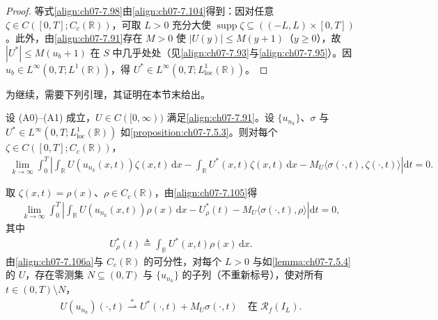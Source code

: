 \documentclass[../../main.tex]{subfiles}%
\begin{document}
\begin{proof}
等式\eqref{align:ch07-7.98}由\eqref{align:ch07-7.104}得到：因对任意 $\zeta\in C([0,T];C_c(\mathbb{R}))$，可取 $L>0$ 充分大使 $\operatorname{supp}\zeta\subseteq((-L,L)\times[0,T])$。此外，由\eqref{align:ch07-7.91}存在 $M>0$ 使 $|U(y)|\leqslant M(y+1)$（$y\geqslant0$），故 $|U^*|\leqslant M(u_b+1)$ 在 $S$ 中几乎处处（见\eqref{align:ch07-7.93}与\eqref{align:ch07-7.95}）。因 $u_b\in L^\infty(0,T;L^1(\mathbb{R}))$，得 $U^*\in L^\infty(0,T;L^1_{\mathrm{loc}}(\mathbb{R}))$。
\end{proof}

为继续，需要下列引理，其证明在本节末给出。

\begin{lemma}\label{lemma:ch07-7.5.4}
设 (A0)--(A1) 成立，$U\in C([0,\infty))$ 满足\eqref{align:ch07-7.91}。设 $\{u_{n_k}\}$、$\sigma$ 与 $U^*\in L^\infty(0,T;L^1_{\mathrm{loc}}(\mathbb{R}))$ 如\cref{proposition:ch07-7.5.3}。则对每个 $\zeta\in C([0,T];C_c(\mathbb{R}))$，
\begin{align}
\lim_{k\to\infty}\int_0^T\left|\int_{\mathbb{R}}U(u_{n_k}(x,t))\zeta(x,t)\,\mathrm{d}x
-\int_{\mathbb{R}}U^*(x,t)\zeta(x,t)\,\mathrm{d}x
-M_U\langle\sigma(\cdot,t),\zeta(\cdot,t)\rangle\right|\mathrm{d}t=0. \label{align:ch07-7.105}
\end{align}
\end{lemma}

\begin{remark}\label{remark:ch07-7.5.1}
取 $\zeta(x,t)=\rho(x)$、$\rho\in C_c(\mathbb{R})$，由\eqref{align:ch07-7.105}得
\begin{align}
\lim_{k\to\infty}\int_0^T\left|\int_{\mathbb{R}}U(u_{n_k}(x,t))\rho(x)\,\mathrm{d}x-U_\rho^*(t)-M_U\langle\sigma(\cdot,t),\rho\rangle\right|\mathrm{d}t=0, \label{align:ch07-7.106a}
\end{align}
其中
\begin{align}
U_\rho^*(t)\triangleq \int_{\mathbb{R}}U^*(x,t)\rho(x)\,\mathrm{d}x. \label{align:ch07-7.106b}
\end{align}
由\eqref{align:ch07-7.106a}与 $C_c(\mathbb{R})$ 的可分性，对每个 $L>0$ 与如\cref{lemma:ch07-7.5.4}的 $U$，存在零测集 $N\subseteq(0,T)$ 与 $\{u_{n_k}\}$ 的子列（不重新标号），使对所有 $t\in(0,T)\setminus N$，
\begin{align}
U(u_{n_k})(\cdot,t)\stackrel{*}{\rightharpoonup}U^*(\cdot,t)+M_U\sigma(\cdot,t)\quad\text{在 }\mathscr{R}_f(I_L). \label{align:ch07-7.107}
\end{align}
\end{remark}
\end{document}

